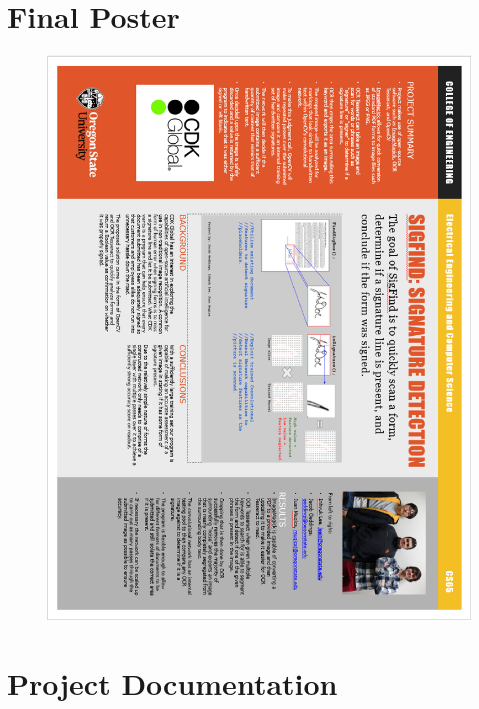 \documentclass[article, onecolumn, draftclsnofoot,10pt, compsoc]{IEEEtran}
\begin{document}
\section{Final Poster}
\begin{figure}[H]
  \centering
  \includegraphics[width=\textwidth]{poster}
\end{figure}

\section{Project Documentation}
\end{document}
